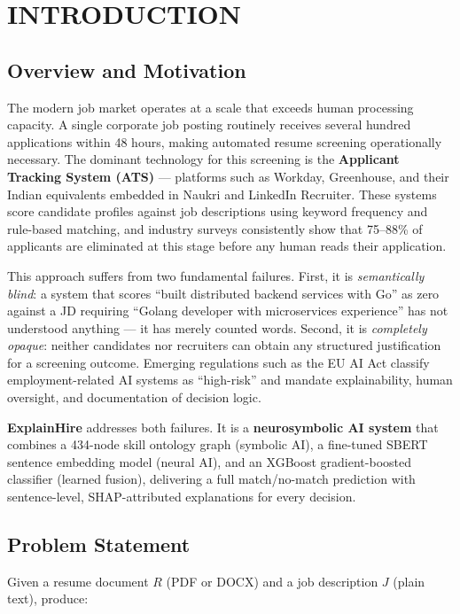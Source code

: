 \documentclass[12pt,a4paper]{report}
\begin{document}
\chapter{INTRODUCTION}

\section{Overview and Motivation}

The modern job market operates at a scale that exceeds human processing capacity. A single corporate job posting routinely receives several hundred applications within 48 hours, making automated resume screening operationally necessary. The dominant technology for this screening is the \textbf{Applicant Tracking System (ATS)} --- platforms such as Workday, Greenhouse, and their Indian equivalents embedded in Naukri and LinkedIn Recruiter. These systems score candidate profiles against job descriptions using keyword frequency and rule-based matching, and industry surveys consistently show that 75--88\% of applicants are eliminated at this stage before any human reads their application.

This approach suffers from two fundamental failures. First, it is \textit{semantically blind}: a system that scores ``built distributed backend services with Go'' as zero against a JD requiring ``Golang developer with microservices experience'' has not understood anything --- it has merely counted words. Second, it is \textit{completely opaque}: neither candidates nor recruiters can obtain any structured justification for a screening outcome. Emerging regulations such as the EU AI Act classify employment-related AI systems as ``high-risk'' and mandate explainability, human oversight, and documentation of decision logic.

\textbf{ExplainHire} addresses both failures. It is a \textbf{neurosymbolic AI system} that combines a 434-node skill ontology graph (symbolic AI), a fine-tuned SBERT sentence embedding model (neural AI), and an XGBoost gradient-boosted classifier (learned fusion), delivering a full match/no-match prediction with sentence-level, SHAP-attributed explanations for every decision.

\section{Problem Statement}

Given a resume document $R$ (PDF or DOCX) and a job description $J$ (plain text), produce:
\end{document}
